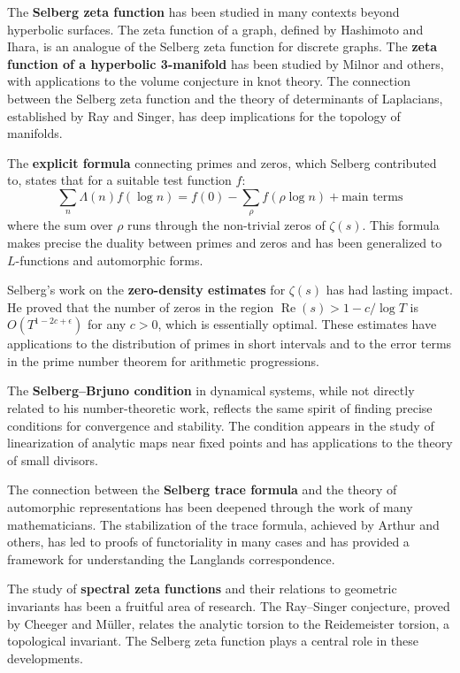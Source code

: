 The \textbf{Selberg zeta function} has been studied in many contexts beyond hyperbolic surfaces. The zeta function of a graph, defined by Hashimoto and Ihara, is an analogue of the Selberg zeta function for discrete graphs. The \textbf{zeta function of a hyperbolic 3-manifold} has been studied by Milnor and others, with applications to the volume conjecture in knot theory. The connection between the Selberg zeta function and the theory of determinants of Laplacians, established by Ray and Singer, has deep implications for the topology of manifolds.

The \textbf{explicit formula} connecting primes and zeros, which Selberg contributed to, states that for a suitable test function $f$:
\[\sum_n \Lambda(n) f(\log n) = f(0) - \sum_\rho f(\rho \log n) + \text{main terms}\]
where the sum over $\rho$ runs through the non-trivial zeros of $\zeta(s)$. This formula makes precise the duality between primes and zeros and has been generalized to $L$-functions and automorphic forms.

Selberg's work on the \textbf{zero-density estimates} for $\zeta(s)$ has had lasting impact. He proved that the number of zeros in the region $\operatorname{Re}(s) > 1 - c/\log T$ is $O(T^{1-2c+\epsilon})$ for any $c > 0$, which is essentially optimal. These estimates have applications to the distribution of primes in short intervals and to the error terms in the prime number theorem for arithmetic progressions.

The \textbf{Selberg--Brjuno condition} in dynamical systems, while not directly related to his number-theoretic work, reflects the same spirit of finding precise conditions for convergence and stability. The condition appears in the study of linearization of analytic maps near fixed points and has applications to the theory of small divisors.

The connection between the \textbf{Selberg trace formula} and the theory of automorphic representations has been deepened through the work of many mathematicians. The stabilization of the trace formula, achieved by Arthur and others, has led to proofs of functoriality in many cases and has provided a framework for understanding the Langlands correspondence.

The study of \textbf{spectral zeta functions} and their relations to geometric invariants has been a fruitful area of research. The Ray--Singer conjecture, proved by Cheeger and M\"{u}ller, relates the analytic torsion to the Reidemeister torsion, a topological invariant. The Selberg zeta function plays a central role in these developments.

